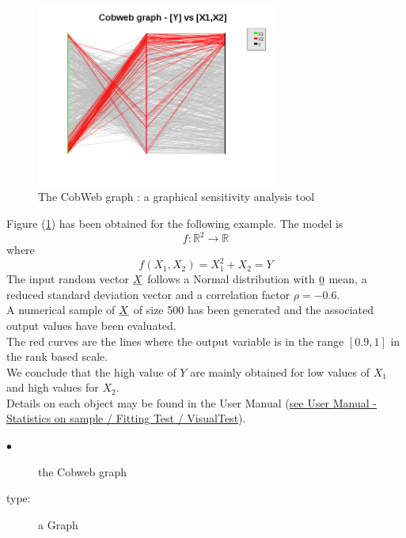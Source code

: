 \begin{figure}[H]
  \begin{center}
    \includegraphics[width=8cm]{cobWeb.png}
    \caption{The CobWeb graph : a graphical sensitivity analysis tool}
    \label{CobWeb}
  \end{center}
\end{figure}


Figure (\ref{CobWeb}) has been obtained for the following example. The model is
$$
f : \mathbb{R}^2 \longrightarrow  \mathbb{R}
$$
where
$$
f(X_1, X_2)  = X_1^2 + X_2 = Y
$$
The input random vector ${\underline{X}}$ follows a Normal distribution with ${\underline{0}}$ mean, a reduced standard deviation vector and a correlation factor $\rho = -0.6$.\\
A numerical sample of ${\underline{X}}$ of size 500 has been generated and the associated output values have been evaluated.\\
The red curves are the lines where the output variable is in the range $[0.9, 1]$ in the rank based scale.\\
We conclude that the high value of $Y$ are mainly obtained for low values of $X_1$ and high values for $X_2$.\\

Details on each object may be found in the User Manual  (\href{OpenTURNS_UserManual_TUI.pdf}{see User Manual - Statistics on sample / Fitting Test / VisualTest}).

{
  \begin{description}
  \item[$\bullet$] the Cobweb graph
  \item[type:] a Graph
  \end{description}
}

